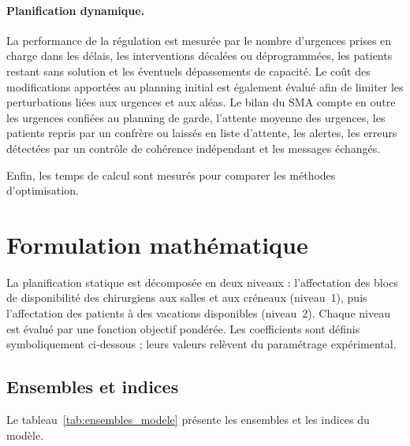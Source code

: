 \documentclass[11pt,a4paper]{article}
\begin{document}
\paragraph{Planification dynamique.}
La performance de la régulation est mesurée par le nombre d'urgences prises en charge dans les délais, les interventions décalées ou déprogrammées, les patients restant sans solution et les éventuels dépassements de capacité. Le coût des modifications apportées au planning initial est également évalué afin de limiter les perturbations liées aux urgences et aux aléas. Le bilan du SMA compte en outre les urgences confiées au planning de garde, l'attente moyenne des urgences, les patients repris par un confrère ou laissés en liste d'attente, les alertes, les erreurs détectées par un contrôle de cohérence indépendant et les messages échangés.

Enfin, les temps de calcul sont mesurés pour comparer les méthodes d'optimisation.



\section{Formulation mathématique}
\label{sec:math}

La planification statique est décomposée en deux niveaux : l'affectation des blocs de disponibilité des chirurgiens aux salles et aux créneaux (niveau~1), puis l'affectation des patients à des vacations disponibles (niveau~2). Chaque niveau est évalué par une fonction objectif pondérée. Les coefficients sont définis symboliquement ci-dessous ; leurs valeurs relèvent du paramétrage expérimental.

\subsection{Ensembles et indices}

Le tableau~\ref{tab:ensembles_modele} présente les ensembles et les indices du modèle.
\end{document}
